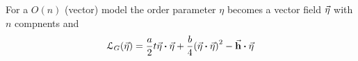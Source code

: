 \documentclass[../main/main.tex]{subfiles}
\begin{document}
\begin{remark}
For a \( O(n) \) (vector) model the order parameter \( \eta  \) becomes a vector field \( \va{\eta } \) with \( n \) compnents and
\begin{equation}
  \mathcal{L}_G ( \va{\eta }) = \frac{a}{2} t \va{\eta } \vdot \va{\eta } + \frac{b}{4} \qty(\va{\eta } \vdot \va{\eta } )^2 - \va{h} \vdot \va{\eta }
\end{equation}
\end{remark}
\end{document}
